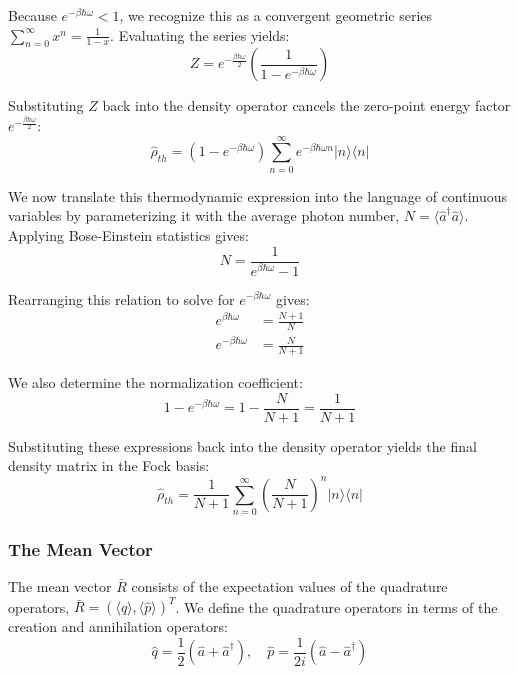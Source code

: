 {Because $e^{-\beta\hbar\omega} < 1$, we recognize this as a convergent geometric series $\sum_{n=0}^\infty x^n = \frac{1}{1-x}$. Evaluating the series yields:
\begin{equation*}
    Z = e^{-\frac{\beta\hbar\omega}{2}} \left( \frac{1}{1 - e^{-\beta\hbar\omega}} \right)
\end{equation*}

Substituting $Z$ back into the density operator cancels the zero-point energy factor $e^{-\frac{\beta\hbar\omega}{2}}$:
\begin{equation*}
    \hat{\rho}_{th} = \left(1 - e^{-\beta\hbar\omega}\right) \sum_{n=0}^{\infty} e^{-\beta\hbar\omega n} |n\rangle\langle n|
\end{equation*}

We now translate this thermodynamic expression into the language of continuous variables by parameterizing it with the average photon number, $N = \langle\hat{a}^{\dagger}\hat{a}\rangle$. Applying Bose-Einstein statistics gives:
\begin{equation*}
    N = \frac{1}{e^{\beta\hbar\omega} - 1}
\end{equation*}

Rearranging this relation to solve for $e^{-\beta\hbar\omega}$ gives:
\begin{align*}
    e^{\beta\hbar\omega} &= \frac{N+1}{N} \nonumber \\
    e^{-\beta\hbar\omega} &= \frac{N}{N+1}
\end{align*}

We also determine the normalization coefficient:
\begin{equation*}
    1 - e^{-\beta\hbar\omega} = 1 - \frac{N}{N+1} = \frac{1}{N+1}
\end{equation*}

Substituting these expressions back into the density operator yields the final density matrix in the Fock basis:
\begin{equation}
    \hat{\rho}_{th} = \frac{1}{N+1}\sum_{n=0}^{\infty}\left(\frac{N}{N+1}\right)^{n}|n\rangle\langle n|
\end{equation}

\subsubsection{The Mean Vector}
The mean vector $\bar{R}$ consists of the expectation values of the quadrature operators, $\bar{R} = (\langle\hat{q}\rangle, \langle\hat{p}\rangle)^T$. We define the quadrature operators in terms of the creation and annihilation operators:
\begin{equation*}
    \hat{q} = \frac{1}{2}(\hat{a} + \hat{a}^{\dagger}), \quad \hat{p} = \frac{1}{2i}(\hat{a} - \hat{a}^{\dagger})
\end{equation*}

}
